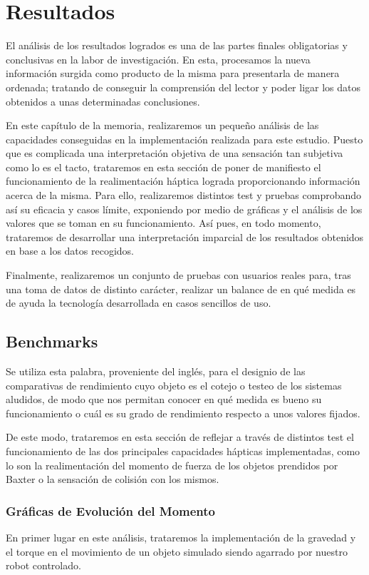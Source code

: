 \chapter{Resultados}
El análisis de los resultados logrados es una de las partes finales obligatorias y conclusivas en la labor de investigación. En esta, procesamos la nueva información surgida como producto de la misma para presentarla de manera ordenada; tratando de conseguir la comprensión del lector y poder ligar los datos obtenidos a unas determinadas conclusiones.

En este capítulo de la memoria, realizaremos un pequeño análisis de las capacidades conseguidas en la implementación realizada para este estudio. Puesto que es complicada una interpretación objetiva de  una sensación tan subjetiva como lo es el tacto, trataremos en esta sección de poner de manifiesto el funcionamiento de la realimentación háptica lograda proporcionando información acerca de la misma. Para ello, realizaremos distintos test y pruebas comprobando así su eficacia y casos límite, exponiendo por medio de gráficas y el análisis de los valores que se toman en su funcionamiento. Así pues, en todo momento, trataremos de desarrollar una interpretación imparcial de los resultados obtenidos en base a los datos recogidos. 

Finalmente, realizaremos un conjunto de pruebas con usuarios reales para, tras una toma de datos de distinto carácter, realizar un balance de en qué medida es de ayuda la tecnología desarrollada en casos sencillos de uso. 

\vfill

\section{Benchmarks}
Se utiliza esta palabra, proveniente del inglés, para el designio de las comparativas de rendimiento cuyo objeto es el cotejo o testeo de los sistemas aludidos, de modo que nos permitan conocer en qué medida es bueno su funcionamiento o cuál es su grado de rendimiento respecto a unos valores fijados. 

De este modo, trataremos en esta sección de reflejar a través de distintos test el funcionamiento de las dos principales capacidades hápticas implementadas, como lo son la realimentación del momento de fuerza de los objetos prendidos por Baxter o la sensación de colisión con los mismos. 

\subsection{Gráficas de Evolución del Momento}
En primer lugar en este análisis, trataremos la implementación de la gravedad y el torque en el movimiento de un objeto simulado siendo agarrado por nuestro robot controlado. 

